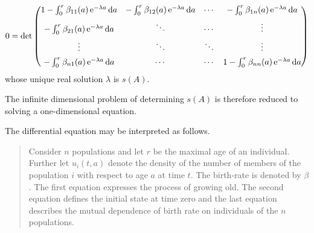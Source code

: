 \begin{example}
%
\[
0 = \det
\begin{pmatrix}
 1 - \textstyle\int_{0}^{r}\beta_{11}(a)\,\mathrm{e}^{-\lambda a}\mathop{}\!\mathrm{d}{a}
   & -\textstyle\int_{0}^{r}\beta_{12}(a)\,\mathrm{e}^{-\lambda a}\mathop{}\!\mathrm{d}{a}
   & \cdots
   & -\textstyle\int_{0}^{r}\beta_{1n}(a)\,\mathrm{e}^{-\lambda a}\mathop{}\!\mathrm{d}{a} \\[1ex]
  -\textstyle\int_{0}^{r}\beta_{21}(a)\,\mathrm{e}^{-\lambda a}\mathop{}\!\mathrm{d}{a}
   & \ddots & \cdots & \vdots \\[1ex]
   \vdots & \ddots & \ddots & \vdots \\[1ex]
  -\textstyle\int_{0}^{r}\beta_{n1}(a)\,\mathrm{e}^{-\lambda a}\mathop{}\!\mathrm{d}{a}
   & \cdots & \cdots
   & 1 - \textstyle\int_{0}^{r}\beta_{nn}(a)\,\mathrm{e}^{-\lambda a}\mathop{}\!\mathrm{d}{a}
\end{pmatrix}
\]
whose unique real solution $\lambda$ is $s(A)$.


The infinite dimensional problem of determining $s(A)$ is therefore reduced to solving a one-dimensional equation.
\end{example}
The differential equation  may be interpreted as follows.
\begin{quote}
Consider $n$ populations and let $r$ be the maximal age of an individual.
Further let $u_{i}(t,a)$ denote the density of the number of members of the population $i$ with respect to age $a$ at time $t$.
The birth-rate is denoted by $\beta$.
The first equation expresses the process of growing old.
The second equation defines the initial state at time zero and the last equation describes the mutual dependence of birth rate on  individuals of the $n$ populations.
\end{quote}
